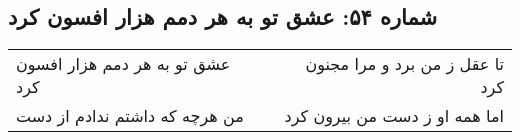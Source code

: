 \begin{center}
\section*{شماره ۵۴: عشق تو به هر دمم هزار افسون کرد}
\label{sec:054}
\begin{longtable}{l p{0.5cm} r}
عشق تو به هر دمم هزار افسون کرد
&&
تا عقل ز من برد و مرا مجنون کرد
\\
من هرچه که داشتم ندادم از دست
&&
اما همه او ز دست من بیرون کرد
\\
\end{longtable}
\end{center}
